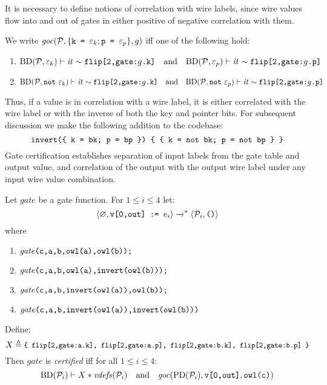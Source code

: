 It is necessary to define notions of correlation with wire
labels, since wire values flow into and out of gates in either
positive of negative correlation with them.
\begin{definition}
  We write $\mathit{goc}(\mathcal{P},\{ \texttt{k = }\varepsilon_{k}; \texttt{p = }\varepsilon_{p} \},g)$ iff one of the
  following hold:
  \begin{enumerate}[\hspace{5mm}i.]
  \item $\mathrm{BD}(\mathcal{P},\varepsilon_k) \vdash \mathit{it} \sim \texttt{flip[2,gate:}g\texttt{.k]}\quad \text{and} \quad
    \mathrm{BD}(\mathcal{P},\varepsilon_p) \vdash \mathit{it} \sim \texttt{flip[2,gate:}g\texttt{.p]}$
  \item $\vc{\progtt(\prog,\enot\ \be_k)}{\itv}{\ttt{flip[2,gate:}g\ttt{.k]}}\quad \text{and}\quad
    \vc{\progtt(\prog,\enot\ \be_p)}{\itv}{\ttt{flip[2,gate:}g\ttt{.p]}}$
  \end{enumerate}
\end{definition}
Thus, if a value is in correlation with a wire label, it is either
correlated with the wire label or with the inverse of both the key and
pointer bits. For subsequent discussion we make the following addition
to the codebase:
$$
\texttt{invert(\{ k = bk; p = bp \}) \{ \{ k = not bk; p = not bp \} \}}
$$
Gate certification establishes separation of input labels from the
gate table and output value, and correlation of the output with
the output wire label under any input wire value combination.
\begin{definition}
  \label{definition-gate-certification}
Let $\mathit{gate}$ be a gate function. For $1 \le i \le 4$  let:
  $$
  \langle \varnothing,\texttt{v[0,out] := } e_i \rangle\xrightarrow{}^{*}\langle \mathcal{P}_i,\texttt{()} \rangle
  $$
  where
  \begin{enumerate}
    \item $\mathit{gate}\texttt{(c,a,b,owl(a),owl(b));}$
    \item $\mathit{gate}\texttt{(c,a,b,owl(a),invert(owl(b)));}$
    \item $\mathit{gate}\texttt{(c,a,b,invert(owl(a)),owl(b));}$
    \item $\mathit{gate}\texttt{(c,a,b,invert(owl(a)),invert(owl(b)))}$
  \end{enumerate}
  Define:
  $${\small X \triangleq \texttt{\{ flip[2,gate:a.k], flip[2,gate:a.p], flip[2,gate:b.k], flip[2,gate:b.p] \}}}$$
  Then $\mathit{gate}$ is \emph{certified} iff for all $1 \le i \le 4$:
  $$
  \mathrm{BD}(\mathcal{P}_i) \vdash X * \mathit{vdefs}(\mathcal{P}_i) 
  \quad \text{and} \quad \mathit{goc}(\mathrm{PD}(\mathcal{P}_i),\texttt{v[0,out]},\texttt{owl(c)})
  $$
\end{definition}
